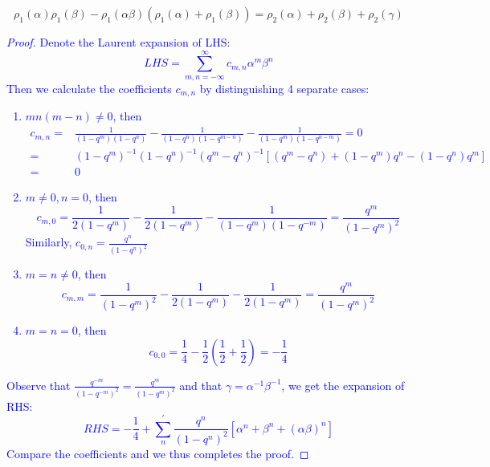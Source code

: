 \documentclass{article}
\begin{document}
\begin{equation*}
\rho_1(\alpha)\rho_1(\beta)-\rho_1(\alpha\beta)(\rho_1(\alpha)+ \rho_1(\beta))= \rho_2(\alpha)+ \rho_2(\beta)+ \rho_2(\gamma)
\end{equation*}

\textcolor{blue}{
 \begin{proof}
   Denote the Laurent expansion of LHS:
   \[LHS= \sum\limits_{m,n=-\infty}^{\infty} c_{m,n}\alpha^m\beta^n\]
   Then we calculate the coefficients $c_{m,n}$ by distinguishing 4 separate cases:    
\begin{enumerate}
\item $mn(m-n)\neq 0$, then
\begin{align*}
 c_{m,n} =& \frac{1}{(1-q^m)(1-q^n)} - \frac{1}{(1-q^n)(1-q^{m-n})} - \frac{1}{(1-q^m)(1-q^{n-m})} = 0\\
 =& (1-q^m)^{-1}(1-q^n)^{-1}(q^m-q^n)^{-1} \left[ (q^m-q^n) + (1-q^m)q^n -(1-q^n)q^m \right]\\
 =&0
\end{align*}
\item $m\neq 0, n=0$, then
 \begin{equation*}
c_{m,0} = \frac{1}{2(1-q^m)} - \frac{1}{2(1-q^m)} - \frac{1}{(1-q^m)(1-q^{-m})} = \frac{q^m}{(1-q^m)^2}
\end{equation*}
Similarly, $c_{0,n} = \frac{q^n}{(1-q^n)^2}$
\item $m=n\neq 0$, then
 \begin{equation*}
c_{m,m} = \frac{1}{(1-q^m)^2} - \frac{1}{2(1-q^m)} - \frac{1}{2(1-q^m)} = \frac{q^m}{(1-q^m)^2}
 \end{equation*}
\item $m=n=0$, then
 \begin{equation*}
c_{0,0} = \frac{1}{4}- \frac{1}{2} \left( \frac{1}{2} + \frac{1}{2} \right) = -\frac{1}{4}
 \end{equation*}
\end{enumerate}
Observe that $\frac{q^{-m}}{(1-q^{-m})^2} = \frac{q^m}{(1-q^m)^2}$ and that $\gamma = \alpha^{-1}\beta^{-1}$, we get the expansion of RHS:
\begin{equation*}
RHS= -\frac{1}{4} + \sum\limits_n^{'} \frac{q^n}{(1-q^n)^2} \left[ \alpha^n + \beta^n + (\alpha\beta)^n \right]
\end{equation*}
Compare the coefficients and we thus completes the proof.
 \end{proof}
}
\end{document}
